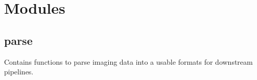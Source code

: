 \documentclass[a4paper,10pt,english,openany,oneside]{sphinxmanual}
\begin{document}
\sphinxstepscope


\chapter{Modules}
\label{\detokenize{pages/modules:module-vipertools.parse}}\label{\detokenize{pages/modules:modules}}\label{\detokenize{pages/modules::doc}}

\section{parse}
\label{\detokenize{pages/modules:parse}}
\sphinxAtStartPar
Contains functions to parse imaging data into a usable formats for downstream pipelines.
\end{document}
